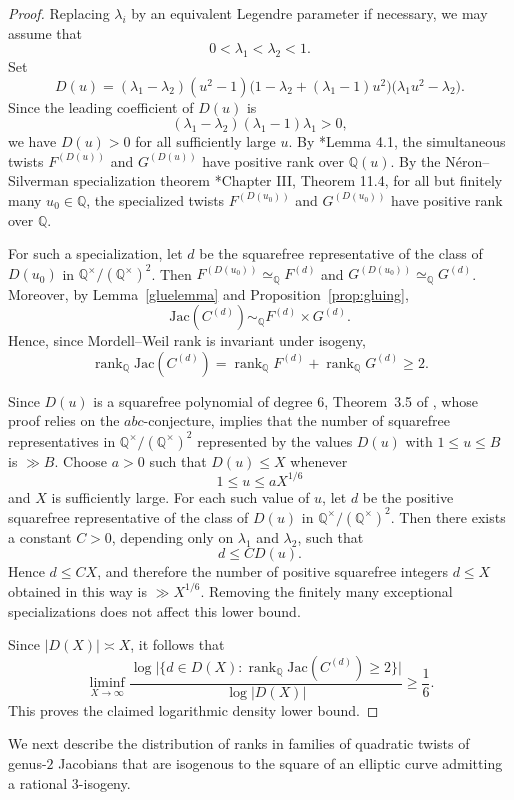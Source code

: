 \documentclass{amsart}
\newcommand{\Q}{{\mathbb Q}}
\newcommand{\Jac}{\mathrm{Jac}}
\DeclareMathOperator{\rank}{\mathrm{rank}}
\begin{document}
\begin{proof}
Replacing $\lambda_i$ by an equivalent Legendre parameter if necessary,
we may assume that
\[
0<\lambda_1<\lambda_2<1.
\]
Set
\[
D(u)
=
(\lambda_1-\lambda_2)(u^2-1)
\bigl(1-\lambda_2+(\lambda_1-1)u^2\bigr)
\bigl(\lambda_1u^2-\lambda_2\bigr).
\]
Since the leading coefficient of $D(u)$ is
\[
(\lambda_1-\lambda_2)(\lambda_1-1)\lambda_1>0,
\]
we have $D(u)>0$ for all sufficiently large $u$.
By \cite{Alaa2017}*{Lemma 4.1}, the simultaneous twists
$F^{(D(u))}$ and $G^{(D(u))}$ have positive rank over $\Q(u)$. By the
Néron--Silverman specialization theorem
\cite{SilvermanAdvanced}*{Chapter III, Theorem 11.4}, for all but finitely many
$u_0\in\Q$, the specialized twists $F^{(D(u_0))}$ and $G^{(D(u_0))}$ have positive
rank over $\Q$.

For such a specialization, let $d$ be the squarefree representative of the class of
$D(u_0)$ in $\Q^\times/(\Q^\times)^2$. Then $F^{(D(u_0))}\simeq_\Q F^{(d)}$ and
$G^{(D(u_0))}\simeq_\Q G^{(d)}$. Moreover, by Lemma~\ref{gluelemma} and
Proposition~\ref{prop:gluing},
\[
\Jac(C^{(d)})\sim_\Q F^{(d)}\times G^{(d)}.
\]
Hence, since Mordell--Weil rank is invariant under isogeny,
\[
\rank_\Q\Jac(C^{(d)})
=
\rank_\Q F^{(d)}+\rank_\Q G^{(d)}
\ge 2.
\]

Since $D(u)$ is a squarefree polynomial of degree $6$, Theorem~3.5 of
\cite{Poonen2003}, whose proof relies on the $abc$-conjecture, implies that the
number of squarefree representatives in $\Q^\times/(\Q^\times)^2$ represented by the values
$D(u)$ with $1\le u\le B$ is $\gg B$.
Choose $a>0$ such that $D(u)\le X$ whenever
\[
1\le u\le aX^{1/6}
\]
and $X$ is sufficiently large. For each such value of $u$, let $d$ be the positive
squarefree representative of the class of $D(u)$ in $\Q^\times/(\Q^\times)^2$.
Then there exists a constant $C>0$, depending only on $\lambda_1$ and $\lambda_2$,
such that
\[
d\le C D(u).
\]
Hence $d\le CX$, and therefore the number of positive squarefree integers
$d\le X$ obtained in this way is $\gg X^{1/6}$.
Removing the finitely many exceptional specializations does not affect this lower bound.

Since $|D(X)|\asymp X$, it follows that
\[
\liminf_{X\to\infty}
\frac{
\log\bigl|\{d\in D(X):\rank_\Q\Jac(C^{(d)})\ge 2\}\bigr|
}{
\log |D(X)|
}
\ge \frac{1}{6}.
\]
This proves the claimed logarithmic density lower bound.
\end{proof}




We next describe the distribution of ranks in families of quadratic twists
of genus-$2$ Jacobians that are isogenous to the square of an elliptic curve admitting
a rational $3$-isogeny.
\end{document}
